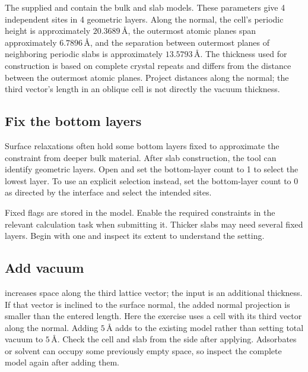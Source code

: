 

The supplied  and  contain the bulk and slab models. These parameters give 4 independent sites in 4 geometric layers. Along the normal, the cell's periodic height is approximately $20.3689\,\text{\AA}$, the outermost atomic planes span approximately $6.7896\,\text{\AA}$, and the separation between outermost planes of neighboring periodic slabs is approximately $13.5793\,\text{\AA}$. The thickness used for construction is based on complete crystal repeats and differs from the distance between the outermost atomic planes. Project distances along the normal; the third vector's length in an oblique cell is not directly the vacuum thickness.

\subsection{Fix the bottom layers}

Surface relaxations often hold some bottom layers fixed to approximate the constraint from deeper bulk material. After slab construction, the tool can identify geometric layers. Open  and set the bottom-layer count to 1 to select the lowest layer. To use an explicit selection instead, set the bottom-layer count to 0 as directed by the interface and select the intended sites.

Fixed flags are stored in the model. Enable the required constraints in the relevant calculation task when submitting it. Thicker slabs may need several fixed layers. Begin with one and inspect its extent to understand the setting.

\subsection{Add vacuum}

 increases space along the third lattice vector; the input is an additional thickness. If that vector is inclined to the surface normal, the added normal projection is smaller than the entered length. Here the exercise uses a cell with its third vector along the normal. Adding $5\,\text{\AA}$ adds to the existing model rather than setting total vacuum to $5\,\text{\AA}$. Check the cell and slab from the side after applying. Adsorbates or solvent can occupy some previously empty space, so inspect the complete model again after adding them.

